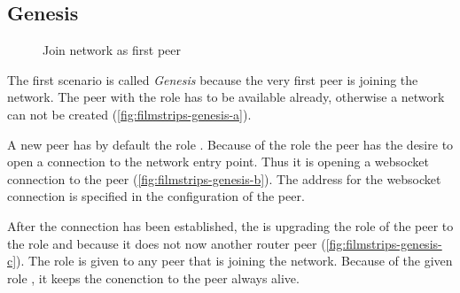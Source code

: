 \subsection{Genesis}

\begin{figure}[htb!]
  \centering
	\caption{Join network as first peer}
\label{fig:filmstrips-genesis}
\end{figure}

The first scenario is called \textit{Genesis} because the very first peer is joining the network. The peer with the role \signal has to be available already, otherwise a network can not be created (\vref{fig:filmstrips-genesis-a}). 

A new peer has by default the role \newbie. Because of the \newbie role the peer has the desire to open a connection to the network entry point. Thus it is opening a websocket connection to the \signal peer (\vref{fig:filmstrips-genesis-b}). The address for the websocket connection is specified in the configuration of the peer.

After the connection has been established, the \signal is upgrading the role of the peer to the role \router and \peer because it does not now another router peer (\vref{fig:filmstrips-genesis-c}). The role \peer is given to any peer that is joining the network.
Because of the given role \router, it keeps the conenction to the \signal peer always alive.

